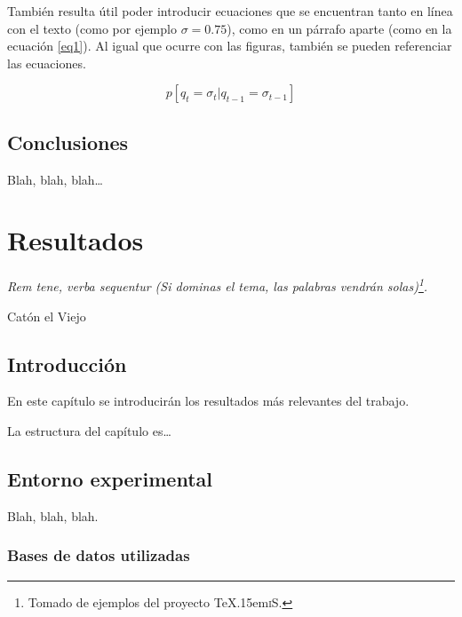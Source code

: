 \documentclass[spanish,openright]{book}
\def\texis{\TeX \raise.15em\hbox{\textsc{i}}S}
\newenvironment{FraseCelebre}{\begin{list}{}{\setlength{\leftmargin}{0.5\textwidth}\setlength{\parsep}{0cm}\addtolength{\topsep}{0.5cm}}
  }
  {\unskip \end{list}}
\newenvironment{Frase}{\item \begin{flushright}\small\em}{\end{flushright}}
\newenvironment{Fuente}{\item \begin{flushright}\small}{\end{flushright}}
\begin{document}
También resulta útil poder introducir ecuaciones que se encuentran tanto
en línea con el texto (como por ejemplo $\sigma=0.75$), como en un
párrafo aparte (como en la ecuación \ref{eq1}). Al igual que ocurre con
las figuras, también se pueden referenciar las ecuaciones.

\begin{equation}
  \label{eq1}
  p[q_t=\sigma_t|q_{t-1}=\sigma_{t-1}]
\end{equation}

\section{Conclusiones}
\label{sec:conclusiones-desarrollo}

Blah, blah, blah\ldots



 


\chapter{Resultados}
\label{cha:resultados}


\begin{FraseCelebre}
  \begin{Frase}
Rem tene, verba sequentur (Si dominas el tema, las palabras vendrán
    solas)\footnote{Tomado de ejemplos del proyecto \texis{}.}.
  \end{Frase}
  \begin{Fuente}
Catón el Viejo
  \end{Fuente}
\end{FraseCelebre}

\section{Introducción}
\label{sec:introduccion-resultados}

En este capítulo se introducirán los resultados más relevantes del
trabajo. 

La estructura del capítulo es\ldots


\section{Entorno experimental}
\label{sec:entorno-experimental}

Blah, blah, blah.


\subsection{Bases de datos utilizadas}
\label{sec:bases-de-datos-1}
\end{document}

